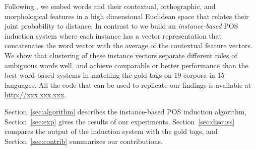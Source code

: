 Following \cite{globerson2007euclidean}, we embed words and their
contextual, orthographic, and morphological features in a high
dimensional Euclidean space that relates their joint probability to
distance.  In contrast to \cite{yatbaz-sert-yuret:2012:EMNLP-CoNLL} we
build an {\em instance-based} POS induction system where each instance
has a vector representation that concatenates the word vector with the
average of the contextual feature vectors.  We show that clustering of
these instance vectors separate different roles of ambiguous words
well, and achieve comparable or better performance than the best
word-based systems in matching the gold tags on 19 corpora in 15
languages.  All the code that can be used to replicate our findings is
available at \url{http://xxx.xxx.xxx}.

Section~\ref{sec:algorithm} describes the instance-based POS induction
algorithm, Section~\ref{sec:exp} gives the results of our experiments,
Section~\ref{sec:discuss} compares the output of the induction system
with the gold tags, and Section~\ref{sec:contrib} summarizes our
contributions.
